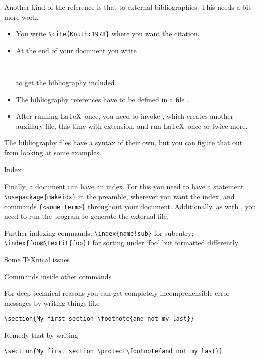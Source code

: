 Another kind of the reference is that to external bibliographies. This
needs a bit more work. 
\begin{itemize}
\item You write \verb+\cite{Knuth:1978}+ where you want the citation.
\item At the end of your document you write
\begin{verbatim}


\end{verbatim}
to get the bibliography included.
\item The bibliography references have to be defined in a file
  .
\item After running \LaTeX\ once, you need to invoke , which creates another auxiliary file, this time with
   extension, and run \LaTeX\ once or twice more.
\end{itemize}
The bibliography files have a syntax of their own, but you can figure
that out from looking at some examples.

 {Index}

Finally, a document can have an index. For this you need to have a
statement \verb+\usepackage{makeidx}+ in the preamble,
 wherever you want the index, and commands
\verb+{<some term>}+ throughout your document. Additionally, as
with , you need to run the program  to generate
the external  file.

Further indexing commands: \verb+\index{name!sub}+ for subentry;
\verb+\index{foo@\textit{foo})+ for sorting under `foo' but formatted
differently.

 {Some \TeX{}nical issues}

 {Commands inside other commands}

For deep technical reasons you can get completely incomprehensible
error messages by writing things like
\begin{verbatim}
\section{My first section \footnote{and not my last}}
\end{verbatim}
Remedy that by writing
\begin{verbatim}
\section{My first section \protect\footnote{and not my last}}
\end{verbatim}

